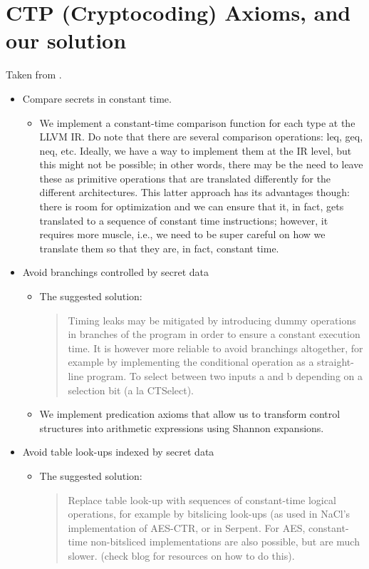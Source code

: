 \section{CTP (Cryptocoding) Axioms, and our solution}
Taken from \cite{cryptocoding}.
\begin{itemize}
\item Compare secrets in constant time.
\begin{itemize}
\item We implement a constant-time comparison function for each type at the LLVM IR. Do note that there are several comparison operations: leq, geq, neq, etc. Ideally, we have a way to implement them at the IR level, but this might not be possible; in other words, there may be the need to leave these as primitive operations that are translated differently for the different architectures. This latter approach has its advantages though: there is room for optimization and we can ensure that it, in fact, gets translated to a sequence of constant time instructions; however, it requires more muscle, i.e., we need to be super careful on how we translate them so that they are, in fact, constant time. 
\end{itemize}
\item Avoid branchings controlled by secret data
\begin{itemize}
\item The suggested solution: 
\begin{quote}
Timing leaks may be mitigated by introducing dummy operations in branches of the program in order to ensure a constant execution time. It is however more reliable to avoid branchings altogether, for example by implementing the conditional operation as a straight-line program. To select between two inputs a and b depending on a selection bit (a la CTSelect). 
\end{quote}
\item We implement predication axioms that allow us to transform control structures into arithmetic expressions using Shannon expansions.
\end{itemize}
\item Avoid table look-ups indexed by secret data
\begin{itemize}
\item The suggested solution: 
\begin{quote}
Replace table look-up with sequences of constant-time logical operations, for example by bitslicing look-ups (as used in NaCl's implementation of AES-CTR, or in Serpent. For AES, constant-time non-bitsliced implementations are also possible, but are much slower. (check blog for resources on how to do this).

\end{quote}
\end{itemize}
\end{itemize}
